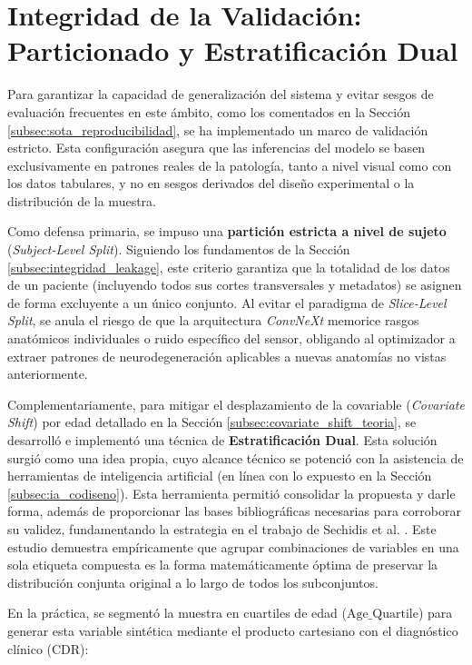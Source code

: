 \documentclass[12pt, oneside, english, spanish]{book}
\begin{document}
\section{Integridad de la Validación: Particionado y Estratificación Dual} \label{sec:integridad_validacion}

Para garantizar la capacidad de generalización del sistema y evitar sesgos de evaluación frecuentes en este ámbito, como los comentados en la Sección \ref{subsec:sota_reproducibilidad}, se ha implementado un marco de validación estricto. Esta configuración asegura que las inferencias del modelo se basen exclusivamente en patrones reales de la patología, tanto a nivel visual como con los datos tabulares, y no en sesgos derivados del diseño experimental o la distribución de la muestra.

Como defensa primaria, se impuso una \textbf{partición estricta a nivel de sujeto} (\textit{Subject-Level Split}). Siguiendo los fundamentos de la Sección \ref{subsec:integridad_leakage}, este criterio garantiza que la totalidad de los datos de un paciente (incluyendo todos sus cortes transversales y metadatos) se asignen de forma excluyente a un único conjunto. Al evitar el paradigma de \textit{Slice-Level Split}, se anula el riesgo de que la arquitectura \textit{ConvNeXt} memorice rasgos anatómicos individuales o ruido específico del sensor, obligando al optimizador a extraer patrones de neurodegeneración aplicables a nuevas anatomías no vistas anteriormente.

Complementariamente, para mitigar el desplazamiento de la covariable (\textit{Covariate Shift}) por edad detallado en la Sección \ref{subsec:covariate_shift_teoria}, se desarrolló e implementó una técnica de \textbf{Estratificación Dual}. Esta solución surgió como una idea propia, cuyo alcance técnico se potenció con la asistencia de herramientas de inteligencia artificial (en línea con lo expuesto en la Sección \ref{subsec:ia_codiseno}). Esta herramienta permitió consolidar la propuesta y darle forma, además de proporcionar las bases bibliográficas necesarias para corroborar su validez, fundamentando la estrategia en el trabajo de Sechidis et al. \cite{sechidis2011}. Este estudio demuestra empíricamente que agrupar combinaciones de variables en una sola etiqueta compuesta es la forma matemáticamente óptima de preservar la distribución conjunta original a lo largo de todos los subconjuntos.

En la práctica, se segmentó la muestra en cuartiles de edad ($\text{Age\_Quartile}$) para generar esta variable sintética mediante el producto cartesiano con el diagnóstico clínico (CDR):
\end{document}
